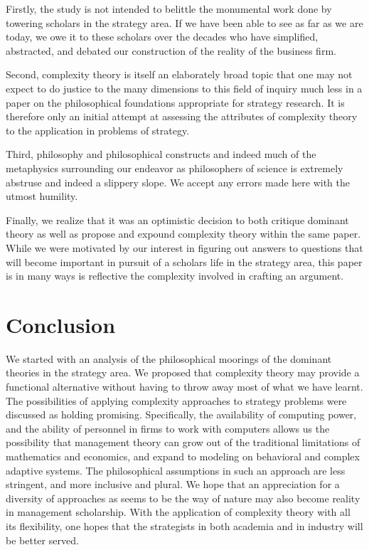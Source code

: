 \documentclass[12pt,letterpaper]{article}
\begin{document}
Firstly, the study is not intended to belittle the monumental work done by towering scholars in the strategy area. If we have been able to see as far as we are today, we owe it to these scholars over the decades who have simplified, abstracted, and debated our construction of the reality of the business firm. 

Second, complexity theory is itself an elaborately broad topic that one may not expect to do justice to the many dimensions to this field of inquiry much less in a  paper on the philosophical foundations appropriate for strategy research. It is therefore only an initial attempt at assessing the attributes of complexity theory to the application in problems of strategy. 

Third, philosophy and philosophical constructs and indeed much of the metaphysics surrounding our endeavor as philosophers of science is extremely abstruse and indeed a slippery slope. We accept any errors made here with the utmost humility. 

Finally, we realize that it was an optimistic decision to both critique dominant theory as well as propose and expound complexity theory within the same paper. While we were  motivated by our interest in figuring out answers to questions that will become important in pursuit of a scholar\textquotesingle s life in the strategy area, this paper is in many ways is reflective the complexity involved in crafting an argument. 

\section{Conclusion}\label{S:Conclusion}
We started with an analysis of the philosophical moorings of the dominant theories in the strategy area. We proposed that complexity theory may provide a functional alternative without having to throw away most of what we have learnt. The possibilities of applying complexity approaches to strategy problems were discussed as holding  promising. Specifically, the availability of computing power, and the ability of personnel in firms to work with computers allows us the possibility that management theory can grow out of the traditional limitations of mathematics and economics, and expand to modeling on behavioral and complex adaptive systems. The philosophical assumptions in such an approach are less stringent, and more inclusive and plural. We hope that an appreciation for a diversity of approaches as seems to be the way of nature may also become reality in management scholarship. With the application of complexity theory with all its flexibility, one hopes that the strategists in both academia and in industry will be better served.

\newpage
\begin{singlespace}
 

\end{singlespace}
\end{document}
